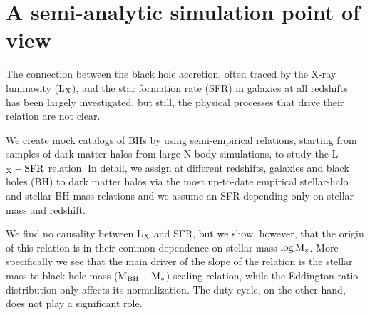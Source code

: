 \chapter{A semi-analytic simulation point of view}


The connection between the black hole accretion, often traced by the X-ray luminosity (L$_{\rm X}$), and the star formation rate (SFR) in galaxies at all redshifts has been largely investigated, but still, the physical processes that drive their relation are not clear. 

We create mock catalogs of BHs by using semi-empirical relations, starting from samples of dark matter halos from large N-body simulations, to study the L$_{\rm X}-{\rm SFR}$ relation.  In detail, we assign at different redshifts, galaxies and black holes (BH) to dark matter halos via the most up-to-date empirical stellar-halo and stellar-BH mass relations and we assume an SFR depending only on stellar mass and redshift.

We find no causality between L$_{\rm X}$ and SFR, but we show, however, that the origin of this relation is in their common dependence on stellar mass $\log {\rm M}_*$. More specifically we see that the main driver of the slope of the relation is the stellar mass to black hole mass (M$_{\rm BH}-{\rm M}_*$) scaling relation, while the Eddington ratio distribution only affects its normalization. The duty cycle, on the other hand, does not play a significant role.


